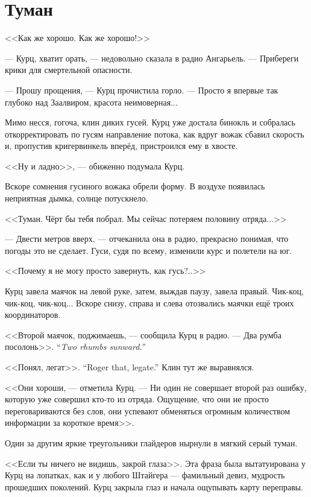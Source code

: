 \section{Туман}

<<Как же хорошо.
Как же хорошо!>>

--- Курц, хватит орать, --- недовольно сказала в радио Ангарьель.
--- Прибереги крики для смертельной опасности.

--- Прошу прощения, --- Курц прочистила горло.
--- Просто я впервые так глубоко над Заалвиром, красота неимоверная...

Мимо несся, гогоча, клин диких гусей.
Курц уже достала бинокль и собралась откорректировать по гусям направление потока, как вдруг вожак сбавил скорость и, пропустив кригервинкель вперёд, пристроился ему в хвосте.

<<Ну и ладно>>, --- обиженно подумала Курц.

Вскоре сомнения гусиного вожака обрели форму.
В воздухе появилась неприятная дымка, солнце потускнело.

<<Туман.
Чёрт бы тебя побрал.
Мы сейчас потеряем половину отряда...>>

--- Двести метров вверх, --- отчеканила она в радио, прекрасно понимая, что погоды это не сделает.
Гуси, судя по всему, изменили курс и полетели на юг.

<<Почему я не могу просто завернуть, как гусь?..>>

Курц завела маячок на левой руке, затем, выждав паузу, завела правый.
Чик-коц, чик-коц, чик-коц...
Вскоре снизу, справа и слева отозвались маячки ещё троих координаторов.

<<Второй маячок, поджимаешь, --- сообщила Курц в радио.
{--- Два румба посолонь>>.}
{``\textit{Two rhumbs sunward.}''}

{<<Понял, легат>>.}
{``Roger that, legate.''}
Клин тут же выравнялся.

<<Они хороши, --- отметила Курц.
--- Ни один не совершает второй раз ошибку, которую уже совершил кто-то из отряда.
Ощущение, что они не просто переговариваются без слов, они успевают обменяться огромным количеством информации за короткое время>>.

Один за другим яркие треугольники глайдеров нырнули в мягкий серый туман.

<<Если ты ничего не видишь, закрой глаза>>.
Эта фраза была вытатуирована у Курц на лопатках, как и у любого Штайгера --- фамильный девиз, мудрость прошедших поколений.
Курц закрыла глаз и начала ощупывать карту переправы.

